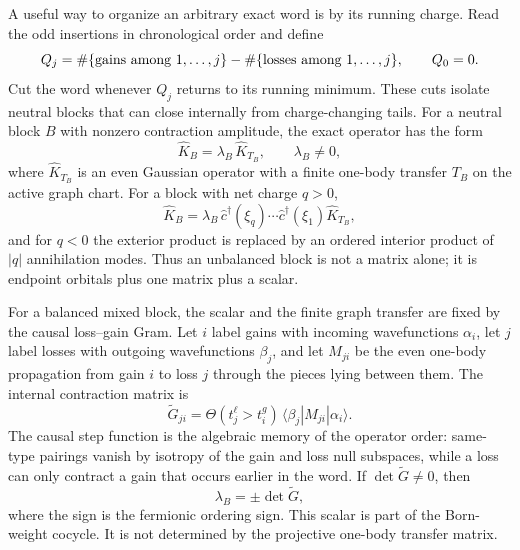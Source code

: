 \documentclass[aps,prb,onecolumn,nofootinbib,superscriptaddress]{revtex4-2}
\theoremstyle{plain}
\theoremstyle{definition}
\begin{document}
A useful way to organize an arbitrary exact word is by its running charge.
Read the odd insertions in chronological order and define
\begin{equation}
  Q_j=\#\{\hbox{gains among }1,\ldots,j\}
      -\#\{\hbox{losses among }1,\ldots,j\},
  \qquad
  Q_0=0 .
  \label{eq:running-charge-definition}
\end{equation}
Cut the word whenever \(Q_j\) returns to its running minimum.  These cuts
isolate neutral blocks that can close internally from charge-changing tails.
For a neutral block \(B\) with nonzero contraction amplitude, the exact
operator has the form
\begin{equation}
  \hat K_B
  =
  \lambda_B\,\hat K_{T_B},
  \qquad
  \lambda_B\ne0 ,
  \label{eq:balanced-block-normal-form}
\end{equation}
where \(\hat K_{T_B}\) is an even Gaussian operator with a finite one-body
transfer \(T_B\) on the active graph chart.  For a block with net charge
\(q>0\),
\begin{equation}
  \hat K_B
  =
  \lambda_B\,
  \hat c^\dagger(\xi_q)\cdots\hat c^\dagger(\xi_1)
  \hat K_{T_B},
  \label{eq:unbalanced-gain-block-normal-form}
\end{equation}
and for \(q<0\) the exterior product is replaced by an ordered interior
product of \(|q|\) annihilation modes.  Thus an unbalanced block is not a
matrix alone; it is endpoint orbitals plus one matrix plus a scalar.

For a balanced mixed block, the scalar and the finite graph transfer are
fixed by the causal loss--gain Gram.  Let \(i\) label gains with incoming
wavefunctions \(\alpha_i\), let \(j\) label losses with outgoing
wavefunctions \(\beta_j\), and let \(M_{ji}\) be the even one-body
propagation from gain \(i\) to loss \(j\) through the pieces lying between
them.  The internal contraction matrix is
\begin{equation}
  \widetilde G_{ji}
  =
  \Theta(t_j^\ell>t_i^g)\,
  \langle \beta_j|M_{ji}|\alpha_i\rangle .
  \label{eq:causal-loss-gain-gram}
\end{equation}
The causal step function is the algebraic memory of the operator order:
same-type pairings vanish by isotropy of the gain and loss null subspaces,
while a loss can only contract a gain that occurs earlier in the word.  If
\(\det\widetilde G\ne0\), then
\begin{equation}
  \lambda_B=\pm\det\widetilde G ,
  \label{eq:balanced-block-amplitude}
\end{equation}
where the sign is the fermionic ordering sign.  This scalar is part of the
Born-weight cocycle.  It is not determined by the projective one-body
transfer matrix.
\end{document}
